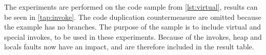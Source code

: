 The experiments are performed on the code sample from \cref{lst:virtual}, results can be seen in \cref{tap:invoke}. The code duplication countermeasure are omitted because the example has no branches. The purpose of the sample is to include virtual and special invokes, to be used in these experiments. Because of the invokes, heap and locals faults now have an impact, and are therefore included in the result table.\\\\